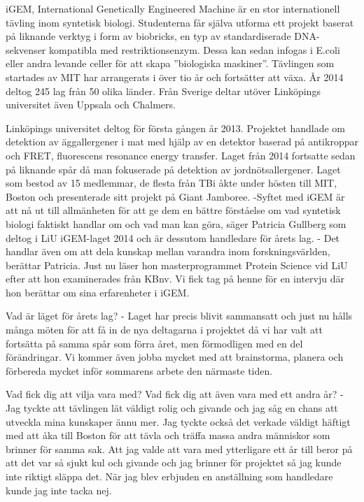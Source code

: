 


iGEM, International Genetically Engineered Machine är en stor internationell tävling inom syntetisk biologi. Studenterna får själva utforma ett projekt baserat på liknande verktyg i form av biobricks, en typ av standardiserade DNA-sekvenser kompatibla med restriktionsenzym. Dessa kan sedan infogas i E.coli eller andra levande celler för att skapa ”biologiska maskiner”. Tävlingen som startades av MIT har arrangerats i över tio år och fortsätter att växa. År 2014 deltog 245 lag från 50 olika länder. Från Sverige deltar utöver Linköpings universitet även Uppsala och Chalmers.






Linköpings universitet deltog för första gången år 2013. Projektet handlade om detektion av äggallergener i mat med hjälp av en detektor baserad på antikroppar och FRET, fluorescens resonance energy transfer. Laget från 2014 fortsatte sedan på liknande spår då man fokuserade på detektion av jordnötsallergener. Laget som bestod av 15 medlemmar, de flesta från TBi åkte under hösten till MIT, Boston och presenterade sitt projekt på Giant Jamboree. 
-Syftet med iGEM är att nå ut till allmänheten för att ge dem en bättre förståelse om vad syntetisk biologi faktiskt handlar om och vad man kan göra, säger Patricia Gullberg som deltog i LiU iGEM-laget 2014 och är dessutom handledare för årets lag.
- Det handlar även om att dela kunskap mellan varandra inom forskningsvärlden, berättar Patricia. Just nu läser hon masterprogrammet Protein Science vid LiU efter att hon examinerades från KBnv. Vi fick tag på henne för en intervju där hon berättar om sina erfarenheter i iGEM. 


Vad är läget för årets lag?
- Laget har precis blivit sammansatt och just nu hålls många möten för att få in de nya deltagarna i projektet då vi har valt att fortsätta på samma spår som förra året, men förmodligen med en del förändringar. Vi kommer även jobba mycket med att brainstorma, planera och förbereda mycket inför sommarens arbete den närmaste tiden.

Vad fick dig att vilja vara med? Vad fick dig att även vara med ett andra år?
- Jag tyckte att tävlingen lät väldigt rolig och givande och jag såg en chans att utveckla mina kunskaper ännu mer. Jag tyckte också det verkade väldigt häftigt med att åka till Boston för att tävla och träffa massa andra människor som brinner för samma sak. Att jag valde att vara med ytterligare ett år till beror på att det var så sjukt kul och givande och jag brinner för projektet så jag kunde inte riktigt släppa det. När jag blev erbjuden en anställning som handledare kunde jag inte tacka nej.

